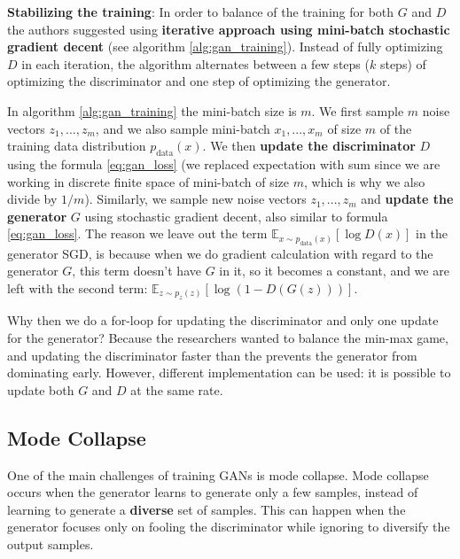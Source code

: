 \textbf{Stabilizing the training}: In order to balance of the training for both $G$ and $D$ the authors suggested using \textbf{iterative approach using mini-batch stochastic gradient decent} (see algorithm \ref{alg:gan_training}). Instead of fully optimizing $D$ in each iteration, the algorithm alternates between a few steps ($k$ steps) of optimizing the discriminator and one step of optimizing the generator.

In algorithm \ref{alg:gan_training} the mini-batch size is $m$. We first sample $m$ noise vectors $z_1, ..., z_m$, and we also sample mini-batch $x_1, ..., x_m$ of size $m$ of the training data distribution $p_\text{data} (x)$. We then \textbf{update the discriminator} $D$ using the formula \ref{eq:gan_loss} (we replaced expectation with sum since we are working in discrete finite space of mini-batch of size $m$, which is why we also divide by $1/m$). Similarly, we sample new noise vectors $z_1, ..., z_m$ and \textbf{update the generator} $G$ using stochastic gradient decent, also similar to formula \ref{eq:gan_loss}. The reason we leave out the term $\mathbb{E}_{x \sim p_{\text{data}}(x)}[\log D(x)]$ in the generator SGD, is because when we do gradient calculation with regard to the generator $G$, this term doesn't have $G$ in it, so it becomes a constant, and we are left with the second term: $\mathbb{E}_{z \sim p_z(z)}[\log(1 - D(G(z)))]$.

Why then we do a for-loop for updating the discriminator and only one update for the generator? Because the researchers wanted to balance the min-max game, and updating the discriminator faster than the prevents the generator from dominating early. However, different implementation can be used: it is possible to update both $G$ and $D$ at the same rate.








\subsection{Mode Collapse}
\label{gan_mode_collapse}

One of the main challenges of training GANs is mode collapse. Mode collapse occurs when the generator learns to generate only a few samples, instead of learning to generate a \textbf{diverse} set of samples. This can happen when the generator focuses only on fooling the discriminator while ignoring to diversify the output samples.

